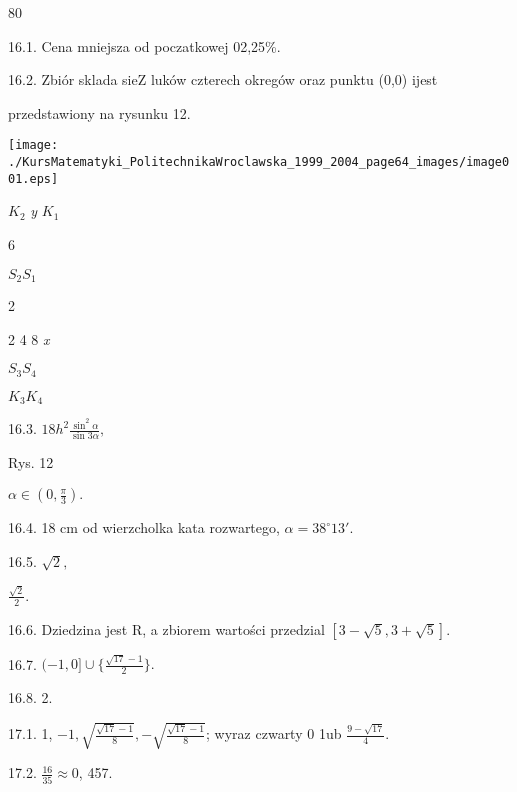\documentclass[a4paper,12pt]{article}
\begin{document}
80

16.1. Cena mniejsza od poczatkowej 02,25\%.

16.2. Zbiór sklada sieZ luków czterech okregów oraz punktu (0,0) ijest

przedstawiony na rysunku 12.
\begin{center}
\texttt{[image: ./KursMatematyki\_PolitechnikaWroclawska\_1999\_2004\_page64\_images/image001.eps]}
\end{center}
$K_{2}$  {\it y}  $K_{1}$

6

$S_{2}  S_{1}$

2

2 4  8  {\it x}

$S_{3}  S_{4}$

$K_{3}  K_{4}$

16.3. $18h^{2}\displaystyle \frac{\sin^{2}\alpha}{\sin 3\alpha},$

Rys. 12

$\alpha\in (0,\displaystyle \frac{\pi}{3}).$

16.4. 18 cm od wierzcholka kata rozwartego, $\alpha=38^{\circ}13'.$

16.5. $\sqrt{2},$

$\displaystyle \frac{\sqrt{2}}{2}.$

16.6. Dziedzina jest $\mathrm{R}$, a zbiorem wartości przedzial $[3-\sqrt{5},3+\sqrt{5}].$

16.7. $(-1,0]\displaystyle \cup\{\frac{\sqrt{17}-1}{2}\}.$

16.8. 2.

17.1. 1, $-1, \sqrt{\frac{\sqrt{17}-1}{8}}, -\sqrt{\frac{\sqrt{17}-1}{8}}$; wyraz czwarty 0 1ub $\displaystyle \frac{9-\sqrt{17}}{4}.$

17.2. $\displaystyle \frac{16}{35}\approx 0$, 457.
\end{document}
